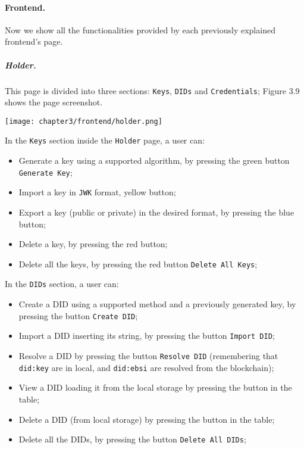 \paragraph{Frontend.}
Now we show all the functionalities provided by each previously explained frontend's 
page.
\subparagraph{Holder.} This page is divided into three sections: \texttt{Keys}, 
\texttt{DIDs} and \texttt{Credentials}; Figure 3.9 shows the page screenshot.
\begin{center}
    \begin{tcolorbox}[
        beamer,
        width=0.6\textheight,
        arc=0pt,
        boxsep=0pt,
        left=0pt,right=0pt,top=0pt,bottom=0pt,
        ]
    \texttt{[image: chapter3/frontend/holder.png]}
    \end{tcolorbox}
    \vspace{-0.3cm}
\end{center}
In the \texttt{Keys} section inside the \texttt{Holder} page, a user can:
\begin{itemize}
    \item Generate a key using a supported algorithm, by pressing the green button \texttt{Generate Key};
    \item Import a key in \texttt{JWK} format, yellow button;
    \item Export a key (public or private) in the desired format, by pressing the
    blue button;
    \item Delete a key, by pressing the red button;
    \item Delete all the keys, by pressing the red button \texttt{Delete All Keys};
\end{itemize}
\vspace*{0.3cm}
In the \texttt{DIDs} section, a user can:
\begin{itemize}
    \item Create a DID using a supported method and a previously generated key, 
    by pressing the button \texttt{Create DID};
    \item Import a DID inserting its string, by pressing the button \texttt{Import DID};
    \item Resolve a DID by pressing the button \texttt{Resolve DID} (remembering that
    \texttt{did:key} are in local, and \texttt{did:ebsi} are resolved from the blockchain);
    \item View a DID loading it from the local storage by pressing the button in the table;
    \item Delete a DID (from local storage) by pressing the button in the table;
    \item Delete all the DIDs, by pressing the button \texttt{Delete All DIDs};
\end{itemize}
